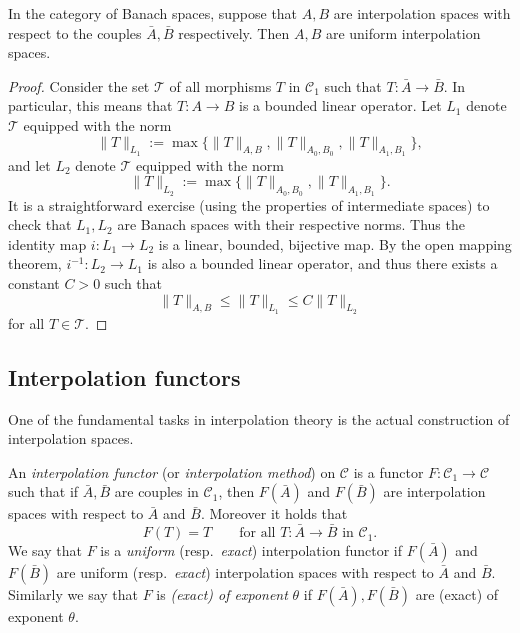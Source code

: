 \begin{theorem}
\label{thm:Banach-interp}
In the category of Banach spaces, suppose that $A,B$ are interpolation spaces with respect to the couples $\bar{A},\bar{B}$ respectively. Then $A,B$ are uniform interpolation spaces.
\end{theorem}
\begin{proof}
Consider the set $\mathcal{T}$ of all morphisms $T$ in $\mathscr{C}_1$ such that $T:\bar{A}\to\bar{B}$. In particular, this means that $T:A\to B$ is a bounded linear operator. Let $L_1$ denote $\mathcal{T}$ equipped with the norm
\begin{equation*}
    \|T\|_{L_1}:=\max\{\|T\|_{A,B},\|T\|_{A_0,B_0},\|T\|_{A_1,B_1}\},
\end{equation*}
and let $L_2$ denote $\mathcal{T}$ equipped with the norm
\begin{equation*}
    \|T\|_{L_2}:=\max\{\|T\|_{A_0,B_0},\|T\|_{A_1,B_1}\}.
\end{equation*}
It is a straightforward exercise (using the properties of intermediate spaces) to check that $L_1, L_2$ are Banach spaces with their respective norms. Thus the identity map $i:L_1\to L_2$ is a linear, bounded, bijective map. By the open mapping theorem, $i^{-1}:L_2\to L_1$ is also a bounded linear operator, and thus there exists a constant $C>0$ such that
\begin{equation*}
    \|T\|_{A,B} \le \|T\|_{L_1} \le C\|T\|_{L_2}
\end{equation*}
for all $T\in\mathcal{T}$.
\end{proof}

\subsection{Interpolation functors}

One of the fundamental tasks in interpolation theory is the actual construction of interpolation spaces.
\begin{definition}
An \emph{interpolation functor} (or \emph{interpolation method}) on $\mathscr{C}$ is a functor $F:\mathscr{C}_1\to\mathscr{C}$ such that if $\bar{A},\bar{B}$ are couples in $\mathscr{C}_1$, then $F(\bar{A})$ and $F(\bar{B})$ are interpolation spaces with respect to $\bar{A}$ and $\bar{B}$. Moreover it holds that
\begin{equation*}
    F(T)=T \qquad \text{for all } T:\bar{A}\to \bar{B} \text{ in }\mathscr{C}_1.
\end{equation*}
We say that $F$ is a \emph{uniform} (resp.\ \emph{exact}) interpolation functor if $F(\bar{A})$ and $F(\bar{B})$ are uniform (resp.\ \emph{exact}) interpolation spaces with respect to $\bar{A}$ and $\bar{B}$. Similarly we say that $F$ is \emph{(exact) of exponent} $\theta$ if $F(\bar{A}),F(\bar{B})$ are (exact) of exponent $\theta$.
\end{definition}


